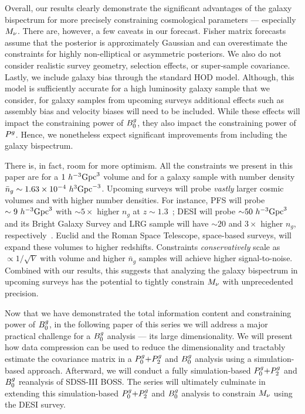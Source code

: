 Overall, our results clearly demonstrate the significant advantages of the
galaxy bispectrum for more precisely constraining cosmological parameters ---
especially $M_\nu$. There are, however, a few caveats in our forecast. 
Fisher matrix forecasts assume that the posterior is approximately Gaussian and
can overestimate the constraints for highly non-elliptical or asymmetric
posteriors. We also do not consider realistic survey geometry, selection
effects, or super-sample covariance. Lastly, we include galaxy bias through the
standard \cite{zheng2007} HOD model. Although, this model is sufficiently
accurate for a high luminosity galaxy sample that we consider, for galaxy 
samples from upcoming surveys additional effects such as assembly bias and
velocity biases will need to be included. While these effects will impact the
constraining power of $B^g_0$, they also impact the constraining power of
$P^g$. Hence, we nonetheless expect significant improvements from including 
the galaxy bispectrum.

There is, in fact, room for more optimism. All the constraints we present in
this paper are for a $1~h^{-3}{\rm Gpc}^3$ volume and for a galaxy sample with number
density $\bar{n}_g \sim 1.63\times 10^{-4}~h^3{\rm Gpc}^{-3}$. Upcoming surveys
will probe {\em vastly} larger cosmic volumes and with higher number densities.
For instance, PFS will probe $\sim 9~h^{-3}{\rm Gpc}^3$ with ${\sim}5\times$
higher $n_g$ at $z{\sim}1.3$~\citep{takada2014}; DESI will probe ${\sim}50~h^{-3}{\rm Gpc}^3$
and its Bright Galaxy Survey and LRG sample will have ${\sim}20$ and $3\times$ 
higher $n_g$, respectively~\citep{desicollaboration2016,ruiz-macias2020}. 
Euclid and the Roman Space Telescope, space-based surveys, will expand these 
volumes to higher redshifts. Constraints {\em conservatively} scale as $\propto 1/\sqrt{V}$
with volume and higher $\bar{n}_g$ samples will achieve higher signal-to-noise. 
Combined with our results, this suggests that analyzing the galaxy bispectrum in 
upcoming surveys has the potential to tightly constrain $M_\nu$ with unprecedented 
precision. 

Now that we have demonstrated the total information content and constraining
power of $B^g_0$, in the following paper of this series we will address a major 
practical challenge for a $B^g_0$ analysis --- its 
large dimensionality. We will present how data compression can be used to reduce 
the dimensionality and tractably estimate the covariance matrix in a $P^g_0{+}P^g_2$ and
$B^g_0$ analysis using a simulation-based approach. Afterward, we will conduct a 
fully simulation-based $P^g_0{+}P^g_2$ and $B^g_0$ reanalysis of SDSS-III BOSS. The series
will ultimately culminate in extending this simulation-based $P^g_0{+}P^g_2$ and $B^g_0$
analysis to constrain $M_\nu$ using the DESI survey. 
